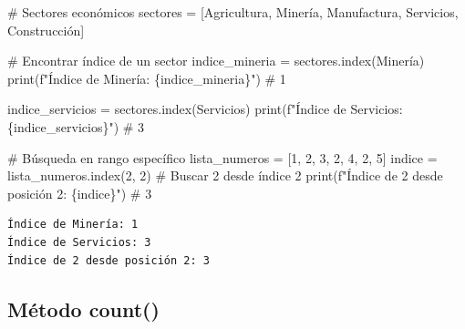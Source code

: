\documentclass[
  doc,
  floatsintext,
  longtable,
  a4paper,
  nolmodern,
  notxfonts,
  notimes,
  12pt,
  colorlinks=true,linkcolor=blue,citecolor=blue,urlcolor=blue]{apa7}
\newenvironment{Shaded}{\begin{snugshade}}{\end{snugshade}}
\newcommand{\BuiltInTok}[1]{\textcolor[rgb]{0.00,0.23,0.31}{#1}}
\newcommand{\CommentTok}[1]{\textcolor[rgb]{0.37,0.37,0.37}{#1}}
\newcommand{\DecValTok}[1]{\textcolor[rgb]{0.68,0.00,0.00}{#1}}
\newcommand{\NormalTok}[1]{\textcolor[rgb]{0.00,0.23,0.31}{#1}}
\newcommand{\OperatorTok}[1]{\textcolor[rgb]{0.37,0.37,0.37}{#1}}
\newcommand{\SpecialCharTok}[1]{\textcolor[rgb]{0.37,0.37,0.37}{#1}}
\newcommand{\SpecialStringTok}[1]{\textcolor[rgb]{0.13,0.47,0.30}{#1}}
\newcommand{\StringTok}[1]{\textcolor[rgb]{0.13,0.47,0.30}{#1}}
\begin{document}
\begin{Shaded}
\begin{Highlighting}[]
\CommentTok{\# Sectores económicos}
\NormalTok{sectores }\OperatorTok{=}\NormalTok{ [}\StringTok{\textquotesingle{}Agricultura\textquotesingle{}}\NormalTok{, }\StringTok{\textquotesingle{}Minería\textquotesingle{}}\NormalTok{, }\StringTok{\textquotesingle{}Manufactura\textquotesingle{}}\NormalTok{, }\StringTok{\textquotesingle{}Servicios\textquotesingle{}}\NormalTok{, }\StringTok{\textquotesingle{}Construcción\textquotesingle{}}\NormalTok{]}

\CommentTok{\# Encontrar índice de un sector}
\NormalTok{indice\_mineria }\OperatorTok{=}\NormalTok{ sectores.index(}\StringTok{\textquotesingle{}Minería\textquotesingle{}}\NormalTok{)}
\BuiltInTok{print}\NormalTok{(}\SpecialStringTok{f"Índice de Minería: }\SpecialCharTok{\{}\NormalTok{indice\_mineria}\SpecialCharTok{\}}\SpecialStringTok{"}\NormalTok{)  }\CommentTok{\# 1}

\NormalTok{indice\_servicios }\OperatorTok{=}\NormalTok{ sectores.index(}\StringTok{\textquotesingle{}Servicios\textquotesingle{}}\NormalTok{)}
\BuiltInTok{print}\NormalTok{(}\SpecialStringTok{f"Índice de Servicios: }\SpecialCharTok{\{}\NormalTok{indice\_servicios}\SpecialCharTok{\}}\SpecialStringTok{"}\NormalTok{)  }\CommentTok{\# 3}

\CommentTok{\# Búsqueda en rango específico}
\NormalTok{lista\_numeros }\OperatorTok{=}\NormalTok{ [}\DecValTok{1}\NormalTok{, }\DecValTok{2}\NormalTok{, }\DecValTok{3}\NormalTok{, }\DecValTok{2}\NormalTok{, }\DecValTok{4}\NormalTok{, }\DecValTok{2}\NormalTok{, }\DecValTok{5}\NormalTok{]}
\NormalTok{indice }\OperatorTok{=}\NormalTok{ lista\_numeros.index(}\DecValTok{2}\NormalTok{, }\DecValTok{2}\NormalTok{)  }\CommentTok{\# Buscar 2 desde índice 2}
\BuiltInTok{print}\NormalTok{(}\SpecialStringTok{f"Índice de 2 desde posición 2: }\SpecialCharTok{\{}\NormalTok{indice}\SpecialCharTok{\}}\SpecialStringTok{"}\NormalTok{)  }\CommentTok{\# 3}
\end{Highlighting}
\end{Shaded}

\begin{verbatim}
Índice de Minería: 1
Índice de Servicios: 3
Índice de 2 desde posición 2: 3
\end{verbatim}

\subsection{Método count()}\label{muxe9todo-count}
\end{document}
